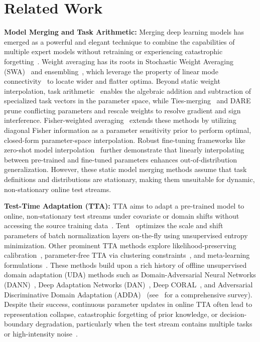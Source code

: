 \documentclass{article}
\theoremstyle{plain}
\theoremstyle{definition}
\theoremstyle{remark}
\begin{document}
\section{Related Work}
\label{submission:related}

\textbf{Model Merging and Task Arithmetic:} Merging deep learning models has emerged as a powerful and elegant technique to combine the capabilities of multiple expert models without retraining or experiencing catastrophic forgetting~\cite{ilharco2023task, yadav2023ties, yu2023dare, chari2024unified}. Weight averaging has its roots in Stochastic Weight Averaging (SWA)~\cite{izmailov2018averaging} and ensembling~\cite{huang2017snapshot, garipov2018loss}, which leverage the property of linear mode connectivity~\cite{frankle2020linear, jordan2022revisiting} to locate wider and flatter optima. Beyond static weight interpolation, task arithmetic~\cite{ilharco2023task} enables the algebraic addition and subtraction of specialized task vectors in the parameter space, while Ties-merging~\cite{yadav2023ties} and DARE~\cite{yu2023dare} prune conflicting parameters and rescale weights to resolve gradient and sign interference. Fisher-weighted averaging~\cite{matena2022merging} extends these methods by utilizing diagonal Fisher information as a parameter sensitivity prior to perform optimal, closed-form parameter-space interpolation. Robust fine-tuning frameworks like zero-shot model interpolation~\cite{wortsman2022robust, cha2021swad} further demonstrate that linearly interpolating between pre-trained and fine-tuned parameters enhances out-of-distribution generalization. However, these static model merging methods assume that task definitions and distributions are stationary, making them unsuitable for dynamic, non-stationary online test streams.

\textbf{Test-Time Adaptation (TTA):} TTA aims to adapt a pre-trained model to online, non-stationary test streams under covariate or domain shifts without accessing the source training data~\cite{liang2020we, wang2021tent}. Tent~\cite{wang2021tent} optimizes the scale and shift parameters of batch normalization layers on-the-fly using unsupervised entropy minimization. Other prominent TTA methods explore likelihood-preserving calibration~\cite{wang2022continual}, parameter-free TTA via clustering constraints~\cite{boudiaf2022parameter}, and meta-learning formulations~\cite{shu2021meta}. These methods build upon a rich history of offline unsupervised domain adaptation (UDA) methods such as Domain-Adversarial Neural Networks (DANN)~\cite{ganin2015unsupervised}, Deep Adaptation Networks (DAN)~\cite{long2015learning}, Deep CORAL~\cite{sun2016deep}, and Adversarial Discriminative Domain Adaptation (ADDA)~\cite{tzeng2017adversarial} (see~\cite{wilson2020survey} for a comprehensive survey). Despite their success, continuous parameter updates in online TTA often lead to representation collapse, catastrophic forgetting of prior knowledge, or decision-boundary degradation, particularly when the test stream contains multiple tasks or high-intensity noise~\cite{wang2022continual}.
\end{document}
